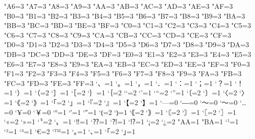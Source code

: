 \xspcode"A6=3
\xspcode"A7=3
\xspcode"A8=3
\xspcode"A9=3
\xspcode"AA=3
\xspcode"AB=3
\xspcode"AC=3
\xspcode"AD=3
\xspcode"AE=3
\xspcode"AF=3
\xspcode"B0=3
\xspcode"B1=3
\xspcode"B2=3
\xspcode"B3=3
\xspcode"B4=3
\xspcode"B5=3
\xspcode"B6=3
\xspcode"B7=3
\xspcode"B8=3
\xspcode"B9=3
\xspcode"BA=3
\xspcode"BB=3
\xspcode"BC=3
\xspcode"BD=3
\xspcode"BE=3
\xspcode"BF=3
\xspcode"C0=3
\xspcode"C1=3
\xspcode"C2=3
\xspcode"C3=3
\xspcode"C4=3
\xspcode"C5=3
\xspcode"C6=3
\xspcode"C7=3
\xspcode"C8=3
\xspcode"C9=3
\xspcode"CA=3
\xspcode"CB=3
\xspcode"CC=3
\xspcode"CD=3
\xspcode"CE=3
\xspcode"CF=3
\xspcode"D0=3
\xspcode"D1=3
\xspcode"D2=3
\xspcode"D3=3
\xspcode"D4=3
\xspcode"D5=3
\xspcode"D6=3
\xspcode"D7=3
\xspcode"D8=3
\xspcode"D9=3
\xspcode"DA=3
\xspcode"DB=3
\xspcode"DC=3
\xspcode"DD=3
\xspcode"DE=3
\xspcode"DF=3
\xspcode"E0=3
\xspcode"E1=3
\xspcode"E2=3
\xspcode"E3=3
\xspcode"E4=3
\xspcode"E5=3
\xspcode"E6=3
\xspcode"E7=3
\xspcode"E8=3
\xspcode"E9=3
\xspcode"EA=3
\xspcode"EB=3
\xspcode"EC=3
\xspcode"ED=3
\xspcode"EE=3
\xspcode"EF=3
\xspcode"F0=3
\xspcode"F1=3
\xspcode"F2=3
\xspcode"F3=3
\xspcode"F4=3
\xspcode"F5=3
\xspcode"F6=3
\xspcode"F7=3
\xspcode"F8=3
\xspcode"F9=3
\xspcode"FA=3
\xspcode"FB=3
\xspcode"FC=3
\xspcode"FD=3
\xspcode"FE=3
\xspcode"FF=3
\inhibitxspcode`、=1
\inhibitxspcode`。=1
\inhibitxspcode`，=1
\inhibitxspcode`．=1
\inhibitxspcode`：=1
\inhibitxspcode`；=1
\inhibitxspcode`？=1
\inhibitxspcode`！=1
\inhibitxspcode`）=1
\inhibitxspcode`（=2
\inhibitxspcode`］=1
\inhibitxspcode`［=2
\inhibitxspcode`｝=1
\inhibitxspcode`｛=2
\inhibitxspcode`‘=2
\inhibitxspcode`’=1
\inhibitxspcode`“=2
\inhibitxspcode`”=1
\inhibitxspcode`〔=2
\inhibitxspcode`〕=1
\inhibitxspcode`〈=2
\inhibitxspcode`〉=1
\inhibitxspcode`《=2
\inhibitxspcode`》=1
\inhibitxspcode`「=2
\inhibitxspcode`」=1
\inhibitxspcode`『=2
\inhibitxspcode`』=1
\inhibitxspcode`【=2
\inhibitxspcode`】=1
\inhibitxspcode`—=0%
\inhibitxspcode`―=0%
\inhibitxspcode`〜=0%
\inhibitxspcode`～=0%
\inhibitxspcode`…=0
\inhibitxspcode`¥=0%
\inhibitxspcode`￥=0%
\inhibitxspcode`°=1
\inhibitxspcode`′=1
\inhibitxspcode`″=1
\inhibitxspcode`⦅=2
\inhibitxspcode`⦆=1
\inhibitxspcode`｟=2
\inhibitxspcode`｠=1
\inhibitxspcode`〘=2
\inhibitxspcode`〙=1
\inhibitxspcode`〖=2
\inhibitxspcode`〗=1
\inhibitxspcode`«=2
\inhibitxspcode`»=1
\inhibitxspcode`〝=2
\inhibitxspcode`〟=1
\inhibitxspcode`‼=1
\inhibitxspcode`⁇=1
\inhibitxspcode`⁈=1
\inhibitxspcode`⁉=1
\inhibitxspcode`¡=2
\inhibitxspcode`¿=2
\inhibitxspcode"AA=1%
\inhibitxspcode"BA=1%
\inhibitxspcode`¹=1
\inhibitxspcode`²=1
\inhibitxspcode`³=1
\inhibitxspcode`€=2
\inhibitxspcode`™=1
\inhibitxspcode`｡=1
\inhibitxspcode`､=1
\inhibitxspcode`｢=2
\inhibitxspcode`｣=1


